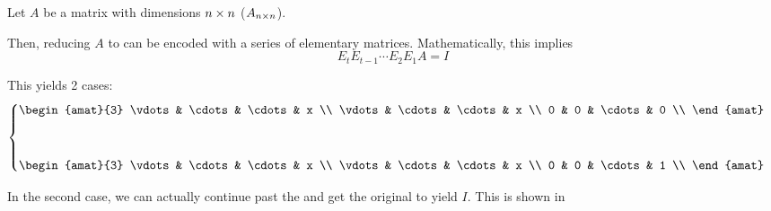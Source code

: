 \begin{theorem}
  Let $A$ be a matrix with dimensions $n \times n$ ($A_{n \times n}$).

  Then, reducing $A$ to  can be encoded with a series of elementary matrices.
  Mathematically, this implies
  \begin{equation*}
    E_{t} E_{t-1} \cdots E_{2} E_{1} A = I
  \end{equation*}

  This yields 2 cases:
  \begin{equation*}
    \begin{cases}
      \begin{amat}{3}
        \vdots & \cdots & \cdots & x \\
        \vdots & \cdots & \cdots & x \\
        0 & 0 & \cdots & 0 \\
      \end{amat} \\[3em]

      \begin{amat}{3}
        \vdots & \cdots & \cdots & x \\
        \vdots & \cdots & \cdots & x \\
        0 & 0 & \cdots & 1 \\
      \end{amat}
    \end{cases}
  \end{equation*}

  In the second case, we can actually continue past the  and get the original  to yield $I$.
  This is shown in 
\end{theorem}

